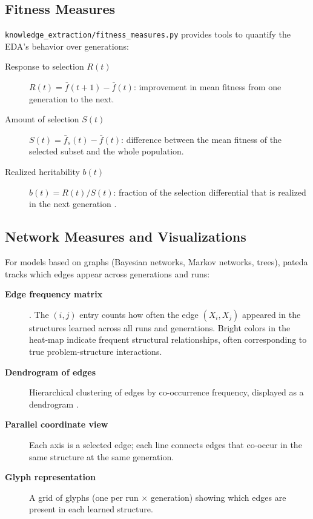 \documentclass[a4paper,11pt]{article}
\begin{document}
\subsection{Fitness Measures}

\texttt{knowledge\_extraction/fitness\_measures.py} provides tools to
quantify the EDA's behavior over generations:

\begin{description}
  \item[Response to selection $R(t)$]
    $R(t) = \bar{f}(t+1) - \bar{f}(t)$: improvement in mean fitness
    from one generation to the next.

  \item[Amount of selection $S(t)$]
    $S(t) = \bar{f}_s(t) - \bar{f}(t)$: difference between the mean
    fitness of the selected subset and the whole population.

  \item[Realized heritability $b(t)$]
    $b(t) = R(t) / S(t)$: fraction of the selection differential that
    is realized in the next generation \citep{Muhlenbein:1997}.
\end{description}

\subsection{Network Measures and Visualizations}

For models based on graphs (Bayesian networks, Markov networks, trees),
pateda tracks which edges appear across generations and runs:

\begin{description}
  \item[\textbf{Edge frequency matrix}]
    \citep{Echegoyen_et_al:2007,Santana_et_al:2007b}.
    The $(i,j)$ entry counts how often the edge $(X_i, X_j)$ appeared
    in the structures learned across all runs and generations.  Bright
    colors in the heat-map indicate frequent structural relationships,
    often corresponding to true problem-structure interactions.

  \item[\textbf{Dendrogram of edges}]
    Hierarchical clustering of edges by co-occurrence frequency, displayed
    as a dendrogram \citep{Hauschild_and_Pelikan:2008}.

  \item[\textbf{Parallel coordinate view}]
    Each axis is a selected edge; each line connects edges that co-occur
    in the same structure at the same generation.

  \item[\textbf{Glyph representation}]
    A grid of glyphs (one per run $\times$ generation) showing which
    edges are present in each learned structure.
\end{description}
\end{document}
